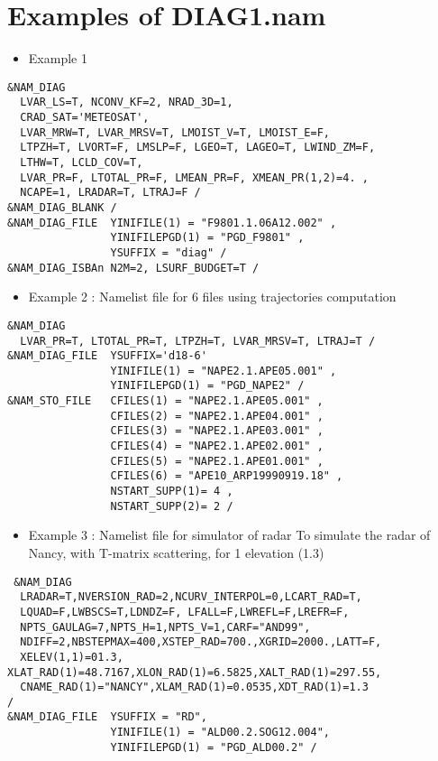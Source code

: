 \section{Examples of DIAG1.nam } \label{ss:diag_ex}
\begin{itemize}
\item Example 1 
\end{itemize}

\begin{verbatim}
&NAM_DIAG 
  LVAR_LS=T, NCONV_KF=2, NRAD_3D=1, 
  CRAD_SAT='METEOSAT',
  LVAR_MRW=T, LVAR_MRSV=T, LMOIST_V=T, LMOIST_E=F,
  LTPZH=T, LVORT=F, LMSLP=F, LGEO=T, LAGEO=T, LWIND_ZM=F,
  LTHW=T, LCLD_COV=T, 
  LVAR_PR=F, LTOTAL_PR=F, LMEAN_PR=F, XMEAN_PR(1,2)=4. ,
  NCAPE=1, LRADAR=T, LTRAJ=F /
&NAM_DIAG_BLANK /
&NAM_DIAG_FILE  YINIFILE(1) = "F9801.1.06A12.002" ,
                YINIFILEPGD(1) = "PGD_F9801" ,
                YSUFFIX = "diag" /
&NAM_DIAG_ISBAn N2M=2, LSURF_BUDGET=T /
\end{verbatim}

\begin{itemize}
\item Example 2 : Namelist file for 6 files using trajectories computation
\end{itemize}

\begin{verbatim}
&NAM_DIAG 
  LVAR_PR=T, LTOTAL_PR=T, LTPZH=T, LVAR_MRSV=T, LTRAJ=T /
&NAM_DIAG_FILE  YSUFFIX='d18-6'
                YINIFILE(1) = "NAPE2.1.APE05.001" ,
                YINIFILEPGD(1) = "PGD_NAPE2" /
&NAM_STO_FILE   CFILES(1) = "NAPE2.1.APE05.001" ,
                CFILES(2) = "NAPE2.1.APE04.001" ,
                CFILES(3) = "NAPE2.1.APE03.001" ,
                CFILES(4) = "NAPE2.1.APE02.001" ,
                CFILES(5) = "NAPE2.1.APE01.001" ,
                CFILES(6) = "APE10_ARP19990919.18" ,
                NSTART_SUPP(1)= 4 , 
                NSTART_SUPP(2)= 2 /
\end{verbatim}
\newpage
\begin{itemize}
\item Example 3 : Namelist file for simulator of radar To simulate the radar of Nancy, with T-matrix scattering, for 1 elevation (1.3)
\end{itemize}

\begin{verbatim}
 &NAM_DIAG
  LRADAR=T,NVERSION_RAD=2,NCURV_INTERPOL=0,LCART_RAD=T,
  LQUAD=F,LWBSCS=T,LDNDZ=F, LFALL=F,LWREFL=F,LREFR=F,
  NPTS_GAULAG=7,NPTS_H=1,NPTS_V=1,CARF="AND99",
  NDIFF=2,NBSTEPMAX=400,XSTEP_RAD=700.,XGRID=2000.,LATT=F,
  XELEV(1,1)=01.3, XLAT_RAD(1)=48.7167,XLON_RAD(1)=6.5825,XALT_RAD(1)=297.55,
  CNAME_RAD(1)="NANCY",XLAM_RAD(1)=0.0535,XDT_RAD(1)=1.3
/
&NAM_DIAG_FILE  YSUFFIX = "RD",
                YINIFILE(1) = "ALD00.2.SOG12.004",
                YINIFILEPGD(1) = "PGD_ALD00.2" /
\end{verbatim}

